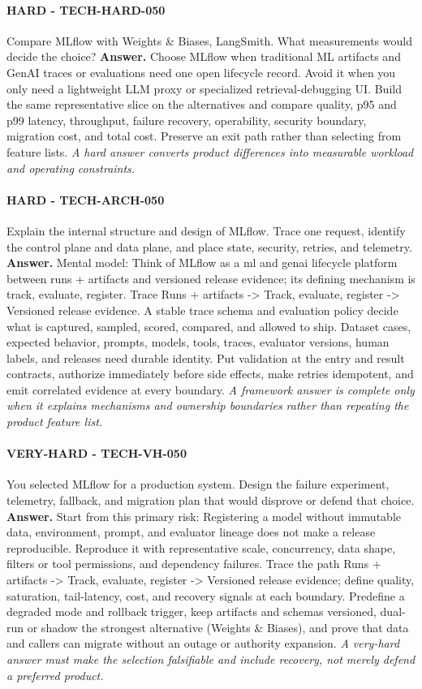 \paragraph{HARD - TECH-HARD-050} Compare MLflow with Weights \& Biases, LangSmith. What measurements would decide the choice?
\textbf{Answer.} Choose MLflow when traditional ML artifacts and GenAI traces or evaluations need one open lifecycle record. Avoid it when you only need a lightweight LLM proxy or specialized retrieval-debugging UI. Build the same representative slice on the alternatives and compare quality, p95 and p99 latency, throughput, failure recovery, operability, security boundary, migration cost, and total cost. Preserve an exit path rather than selecting from feature lists.
\textit{A hard answer converts product differences into measurable workload and operating constraints.}
\paragraph{HARD - TECH-ARCH-050} Explain the internal structure and design of MLflow. Trace one request, identify the control plane and data plane, and place state, security, retries, and telemetry.
\textbf{Answer.} Mental model: Think of MLflow as a ml and genai lifecycle platform between runs + artifacts and versioned release evidence; its defining mechanism is track, evaluate, register. Trace Runs + artifacts -> Track, evaluate, register -> Versioned release evidence. A stable trace schema and evaluation policy decide what is captured, sampled, scored, compared, and allowed to ship. Dataset cases, expected behavior, prompts, models, tools, traces, evaluator versions, human labels, and releases need durable identity. Put validation at the entry and result contracts, authorize immediately before side effects, make retries idempotent, and emit correlated evidence at every boundary.
\textit{A framework answer is complete only when it explains mechanisms and ownership boundaries rather than repeating the product feature list.}
\paragraph{VERY-HARD - TECH-VH-050} You selected MLflow for a production system. Design the failure experiment, telemetry, fallback, and migration plan that would disprove or defend that choice.
\textbf{Answer.} Start from this primary risk: Registering a model without immutable data, environment, prompt, and evaluator lineage does not make a release reproducible. Reproduce it with representative scale, concurrency, data shape, filters or tool permissions, and dependency failures. Trace the path Runs + artifacts -> Track, evaluate, register -> Versioned release evidence; define quality, saturation, tail-latency, cost, and recovery signals at each boundary. Predefine a degraded mode and rollback trigger, keep artifacts and schemas versioned, dual-run or shadow the strongest alternative (Weights \& Biases), and prove that data and callers can migrate without an outage or authority expansion.
\textit{A very-hard answer must make the selection falsifiable and include recovery, not merely defend a preferred product.}

